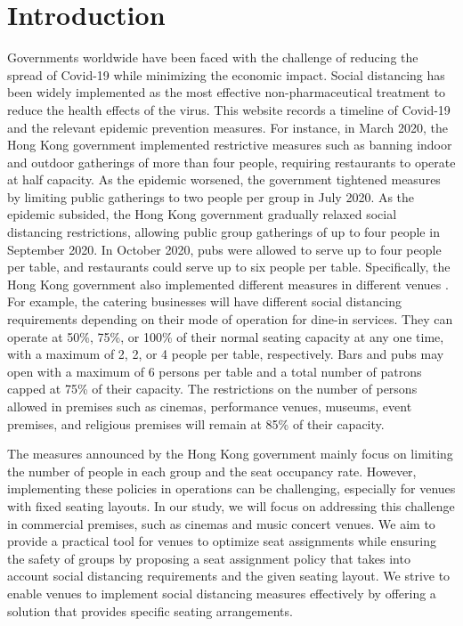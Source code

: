 \section{Introduction}
Governments worldwide have been faced with the challenge of reducing the spread of Covid-19 while minimizing the economic impact. Social distancing has been widely implemented as the most effective non-pharmaceutical treatment to reduce the health effects of the virus. 
This website records a timeline of Covid-19 and the relevant epidemic prevention measures\cite{Covid19Timeline}. For instance, in March 2020, the Hong Kong government implemented restrictive measures such as banning indoor and outdoor gatherings of more than four people, requiring restaurants to operate at half capacity. As the epidemic worsened, the government tightened measures by limiting public gatherings to two people per group in July 2020. As the epidemic subsided, the Hong Kong government gradually relaxed social distancing restrictions, allowing public group gatherings of up to four people in September 2020. In October 2020, pubs were allowed to serve up to four people per table, and restaurants could serve up to six people per table. Specifically, the Hong Kong government also implemented different measures in different venues \cite{Gov202209}. For example, the catering businesses will have different social distancing requirements depending on their mode of operation for dine-in services. They can operate at 50\%, 75\%, or 100\% of their normal seating capacity at any one time, with a maximum of 2, 2, or 4 people per table, respectively. Bars and pubs may open with a maximum of 6 persons per table and a total number of patrons capped at 75\% of their capacity. The restrictions on the number of persons allowed in premises such as cinemas, performance venues, museums, event premises, and religious premises will remain at 85\% of their capacity.

The measures announced by the Hong Kong government mainly focus on limiting the number of people in each group and the seat occupancy rate. However, implementing these policies in operations can be challenging, especially for venues with fixed seating layouts. In our study, we will focus on addressing this challenge in commercial premises, such as cinemas and music concert venues. We aim to provide a practical tool for venues to optimize seat assignments while ensuring the safety of groups by proposing a seat assignment policy that takes into account social distancing requirements and the given seating layout. We strive to enable venues to implement social distancing measures effectively by offering a solution that provides specific seating arrangements.


